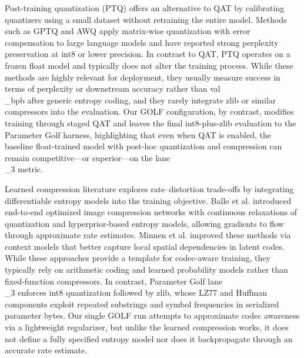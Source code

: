 \documentclass{article}
\begin{document}
Post-training quantization (PTQ) offers an alternative to QAT by calibrating quantizers using a small dataset without retraining the entire model. Methods such as GPTQ and AWQ apply matrix-wise quantization with error compensation to large language models and have reported strong perplexity preservation at int8 or lower precision. In contrast to QAT, PTQ operates on a frozen float model and typically does not alter the training process. While these methods are highly relevant for deployment, they usually measure success in terms of perplexity or downstream accuracy rather than val\\_bpb after generic entropy coding, and they rarely integrate zlib or similar compressors into the evaluation. Our GOLF configuration, by contrast, modifies training through staged QAT and leaves the final int8-plus-zlib evaluation to the Parameter Golf harness, highlighting that even when QAT is enabled, the baseline float-trained model with post-hoc quantization and compression can remain competitive---or superior---on the lane\\_3 metric.

Learned compression literature explores rate--distortion trade-offs by integrating differentiable entropy models into the training objective. Balle et al. introduced end-to-end optimized image compression networks with continuous relaxations of quantization and hyperprior-based entropy models, allowing gradients to flow through approximate rate estimates. Minnen et al. improved these methods via context models that better capture local spatial dependencies in latent codes. While these approaches provide a template for codec-aware training, they typically rely on arithmetic coding and learned probability models rather than fixed-function compressors. In contrast, Parameter Golf lane\\_3 enforces int8 quantization followed by zlib, whose LZ77 and Huffman components exploit repeated substrings and symbol frequencies in serialized parameter bytes. Our single GOLF run attempts to approximate codec awareness via a lightweight regularizer, but unlike the learned compression works, it does not define a fully specified entropy model nor does it backpropagate through an accurate rate estimate.
\end{document}
